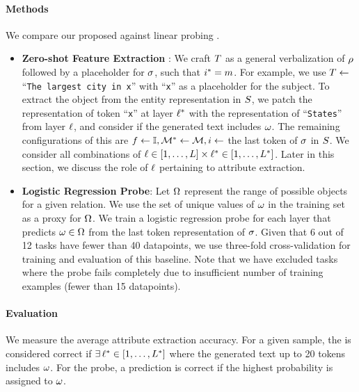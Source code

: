 \documentclass{article}
\theoremstyle{plain}
\theoremstyle{definition}
\theoremstyle{remark}
\begin{document}
\paragraph{Methods} 
We compare our proposed \methodName{} against linear probing \cite{kohn2015s, gupta2015distributional}.

\begin{itemize}[itemsep=1pt, topsep=0pt,leftmargin=*]
    \item \textbf{Zero-shot Feature Extraction} \methodName{}: 
    We craft $T$ as a general verbalization of $\rho$ followed by a placeholder for $\sigma$, such that $i^* = m$. For example, we use $T \leftarrow $ ``\texttt{The largest city in x}'' with ``\texttt{x}'' as a placeholder for the subject. To extract the object from the entity representation in $S$, we patch the representation of token ``\texttt{x}'' at layer $\ell^*$ with the representation of ``\texttt{States}'' from layer $\ell$, and consider if
 the generated text includes $\omega$. 
    The remaining configurations of this \methodName{} are $f \leftarrow \mathbb{I}, \mathcal{M}^* \leftarrow \mathcal{M}, i \leftarrow $ the last token of $\sigma$ in $S$. 
    We consider all combinations of $\ell \in [1, \ldots, L] \times \ell^* \in [1, \ldots, L^*]$. Later in this section, we discuss the role of $\ell$ pertaining to attribute extraction. 
    \item \textbf{Logistic Regression Probe}: Let $\Omega$ represent the range of possible objects for a given relation. We use the set of unique values of $\omega$ in the training set as a proxy for $\Omega$. We train a logistic regression probe \cite{kohn2015s, gupta2015distributional} for each layer that predicts $\omega \in \Omega$ from the last token representation of $\sigma$. Given that 6 out of 12 tasks have fewer than 40 datapoints, we use three-fold cross-validation for training and evaluation of this baseline. Note that we have excluded tasks where the probe fails completely due to insufficient number of training examples (fewer than 15 datapoints).
\end{itemize}


\paragraph{Evaluation} We measure the average attribute extraction accuracy. For a given sample, the \methodName{} is considered correct if $ \exists \, \ell^* \in [1, \ldots, L^*]$ where the generated text up to 20 tokens includes $\omega$. For the probe, a prediction is correct if the highest probability is assigned to $\omega$.
\end{document}
